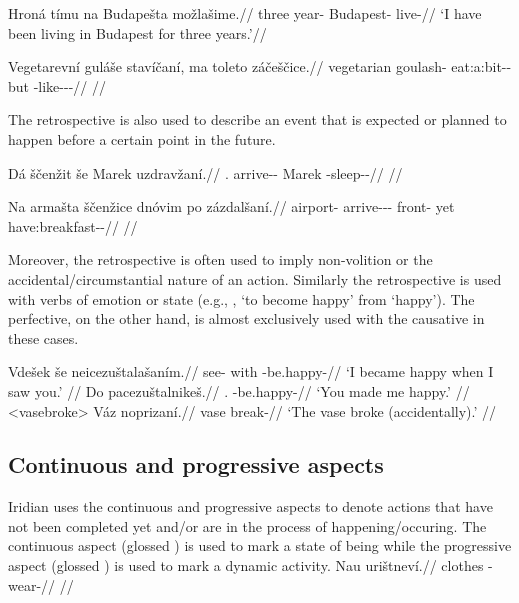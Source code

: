 \pex
\begingl
\gla Hroná tímu na Budapešta možlašime.//
\glb three year-\Ins{} \Loc{} Budapest-\Acc{} live-//
\glft `I have been living in Budapest for three years.'//
\endgl
\xe

\pex
\begingl
\gla Vegetarevn\'i gul\'a\v{s}e stav\'i\v{c}an\'i, ma toleto z\'a\v{c}e\v{s}\v{c}ice.//
\glb vegetarian goulash-\Gen{} eat:a:bit-\Av{}-\Ret{} but \Aff{} \Neg{}-like-\Av{}-\Pf{}-\Quot{}//
\glft {} //
\endgl
\xe

The retrospective is also used to describe an event that is expected or planned to happen before a certain point in the future.

\pex
\begingl
\gla D\'a \v{s}\v{c}en\v{z}it \v{s}e Marek uzdrav\v{z}an\'i.//
\glb \First{}\Sg{}.\Str{} arrive-\Av{}-\SupP{} \Com{} Marek \Refl{}-sleep-\Av{}-\Ret{}//
\glft {} //
\endgl
\xe

\pex
\begingl
\gla Na arma\v{s}ta \v{s}\v{c}en\v{z}ice dn\'ovim po z\'azdal\v{s}an\'i.//
\glb \Loc{} airport-\Acc{} arrive-\Av{}-\SupP{}-\Att{} front-\Ins{} yet have:breakfast-\Av{}-\Ret{}//
\glft {} //
\endgl
\xe

Moreover, the retrospective is often used to imply non-volition or the  accidental/circumstantial nature of an action. Similarly the retrospective is used with verbs of emotion or state (e.g., , ‘to become happy’ from  ‘happy’). The perfective, on the other hand, is almost exclusively used with the causative in these cases.

\pex
\a	\begingl
\gla Vdešek še neicezuštalašaním.//
\glb see- with -be.happy-//
\glft `I became happy when I saw you.' //
\endgl
\a	\begingl
\gla Do pacezuštalnikeš.//
\glb \First{}\Sg{}.\Wk{} \Caus{}-be.happy-//
\glft `You made me happy.' //
\endgl
\xe
\pex<vasebroke>
\begingl
\gla Váz noprizaní.//
\glb vase break-//
\glft `The vase broke (accidentally).' //
\endgl
\xe

\subsection{Continuous and progressive aspects}
Iridian uses the continuous and progressive aspects to denote actions that have not been completed yet and/or are in the process of happening/occuring. The continuous aspect (glossed ) is used to mark a state of being while the progressive aspect (glossed ) is used to mark a dynamic activity.
\pex
\begingl
\gla Nau urištneví.//
\glb clothes \Refl{}-wear-//
\glft {} //
\endgl
\xe

